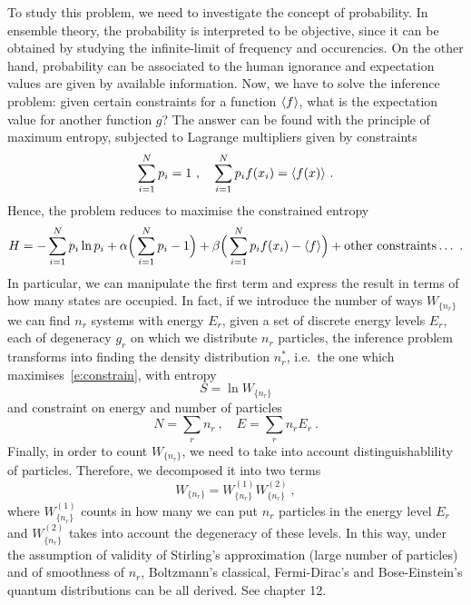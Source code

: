     To study this problem, we need to investigate the concept of probability. In ensemble theory, the probability is interpreted to be objective, since it can be obtained by studying the infinite-limit of frequency and occurencies. On the other hand, probability can be associated to the human ignorance and expectation values are given by available information. Now, we have to solve the inference problem: given certain constraints for a function $\langle f\rangle$, what is the expectation value for another function $g$? The answer can be found with the principle of maximum entropy, subjected to Lagrange multipliers given by constraints 
    \begin{equation*}
        \sum_{i=1}^{N} p_i = 1 ~, \quad \sum_{i=1}^{N} p_i f(x_i) = \langle f(x)\rangle ~.
    \end{equation*}
    Hence, the problem reduces to maximise the constrained entropy
    \begin{equation}\label{e:constrain}
        H = - \sum_{i=1}^{N} p_i \ln p_i + \alpha \Big( \sum_{i=1}^{N} p_i - 1 \Big) + \beta \Big( \sum_{i=1}^{N} p_i f(x_i) - \langle f\rangle \Big) + \text{other constraints} \ldots~.
    \end{equation}
    In particular, we can manipulate the first term and express the result in terms of how many states are occupied. In fact, if we introduce the number of ways $W_{\{n_r\}}$ we can find $n_r$ systems with energy $E_r$, given a set of discrete energy levels $E_r$, each of degeneracy $g_r$ on which we distribute $n_r$ particles, the inference problem transforms into finding the density distribution $n_r^*$, i.e.~the one which maximises~\eqref{e:constrain}, with entropy
    \begin{equation*}
        S = \ln W_{\{n_r\}}
    \end{equation*} 
    and constraint on energy and number of particles
    \begin{equation*}
        N = \sum_{r} n_r ~, \quad E = \sum_r n_r E_r ~.
    \end{equation*}
    Finally, in order to count $W_{\{n_r\}}$, we need to take into account distinguishablility of particles. Therefore, we decomposed it into two terms
    \begin{equation}\label{e:count}
        W_{\{n_r\}} = W_{\{n_r\}}^{(1)} W_{\{n_r\}}^{(2)} ~,
    \end{equation}
    where $W_{\{n_r\}}^{(1)}$ counts in how many we can put $n_r$ particles in the energy level $E_r$ and $W_{\{n_r\}}^{(2)}$ takes into account the degeneracy of these levels. In this way, under the assumption of validity of Stirling's approximation (large number of particles) and of smoothness of $n_r$, Boltzmann's classical, Fermi-Dirac's and Bose-Einstein's quantum distributions can be all derived. See chapter 12.


